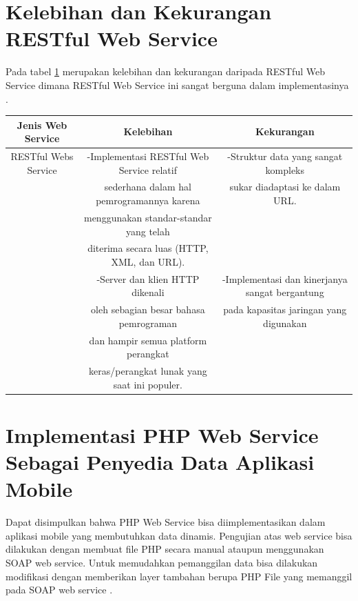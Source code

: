 \section{Kelebihan dan Kekurangan RESTful Web Service}
Pada tabel \ref{table:contoh} merupakan kelebihan dan kekurangan daripada RESTful Web Service dimana RESTful Web Service ini sangat berguna dalam implementasinya \cite{nugroho2012perbandingan}.
\begin{table}[h]
\begin{tabular}{|c|c|c|}
\hline
Jenis Web Service&Kelebihan&Kekurangan\\
\hline
RESTful Webs Service&-Implementasi RESTful Web Service relatif& -Struktur data yang sangat kompleks\\
&sederhana dalam hal pemrogramannya karena& sukar diadaptasi ke dalam URL.\\
&menggunakan standar-standar yang telah&\\
&diterima secara luas (HTTP, XML, dan URL).&\\
&-Server dan klien HTTP dikenali&-Implementasi dan kinerjanya sangat bergantung\\
&oleh sebagian besar bahasa pemrograman&pada kapasitas jaringan yang digunakan\\
&dan hampir semua platform perangkat&\\
&keras/perangkat lunak yang saat ini populer.&\\
\hline
\end{tabular}
\label{table:contoh}
\end{table}

\section{Implementasi PHP Web Service Sebagai Penyedia Data Aplikasi Mobile}
Dapat disimpulkan bahwa PHP Web Service bisa diimplementasikan dalam aplikasi mobile yang membutuhkan data dinamis. Pengujian atas web service bisa dilakukan dengan membuat file PHP secara manual ataupun menggunakan SOAP web service. Untuk memudahkan pemanggilan data bisa dilakukan modifikasi dengan memberikan layer tambahan berupa PHP File yang memanggil pada SOAP web service
\cite{surendra2014implementasi}.

